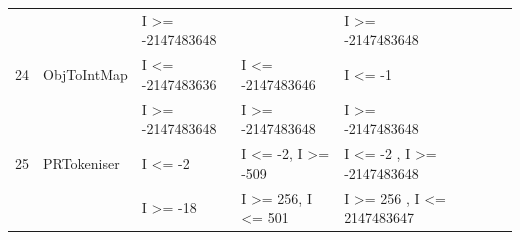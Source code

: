 {\begin{longtable}{|l|l|l|l|l|l|l|l|l|}
	&                                             & I \textgreater= -2147483648				& 										& I \textgreater= -2147483648				\\	
24	& ObjToIntMap				& I \textless= -2147483636					& I \textless= -2147483646				& I \textless= -1								\\ 
	&                                             & I \textgreater= -2147483648				& I \textgreater= -2147483648			& I \textgreater= -2147483648			   	\\	
25	& PRTokeniser				& I \textless= -2								& I \textless= -2, I \textgreater= -509		& I \textless= -2 , I \textgreater= -2147483648\\ 
	&                                             & I \textgreater= -18							& I \textgreater= 256, I \textless= 501		& I \textgreater= 256	, I \textless= 2147483647\\
  







\end{longtable}}
